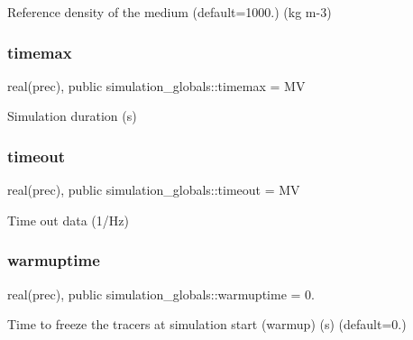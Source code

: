 Reference density of the medium (default=1000.) (kg m-\/3) 

\mbox{\label{namespacesimulation__globals_aca61ad35c1c57ca41152ce3707d412e3}} 
\subsubsection{\texorpdfstring{timemax}{timemax}}
{\footnotesize\ttfamily real(prec), public simulation\+\_\+globals\+::timemax = MV}



Simulation duration (s) 

\mbox{\label{namespacesimulation__globals_ac867a68f020b7352cd68bbe996cfdf24}} 
\subsubsection{\texorpdfstring{timeout}{timeout}}
{\footnotesize\ttfamily real(prec), public simulation\+\_\+globals\+::timeout = MV}



Time out data (1/\+Hz) 

\mbox{\label{namespacesimulation__globals_a1be81c2d5db4400cd1a9a1c4e25728d2}} 
\subsubsection{\texorpdfstring{warmuptime}{warmuptime}}
{\footnotesize\ttfamily real(prec), public simulation\+\_\+globals\+::warmuptime = 0.}



Time to freeze the tracers at simulation start (warmup) (s) (default=0.) 

